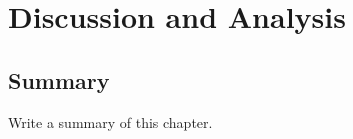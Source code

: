 \chapter{Discussion and Analysis}
\label{ch:evaluation}


\section{Summary}
Write a summary of this chapter.